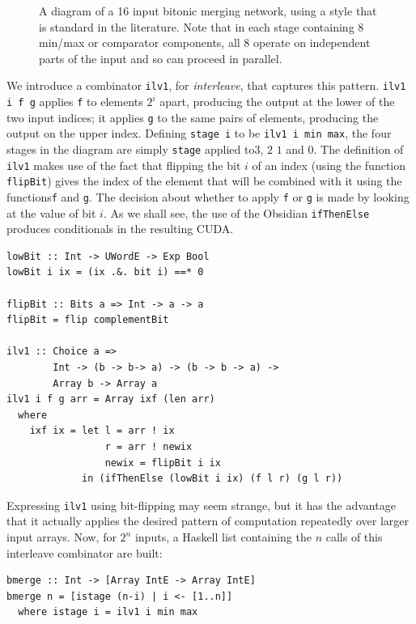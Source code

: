 \documentclass[]{sigplanconf}
\begin{document}
\begin{figure}
\caption{A diagram of a 16 input bitonic merging network, using
a style that is standard in the literature. Note
that in each stage containing 8 min/max or comparator components, all
8 operate on independent parts of the input and so can proceed in parallel.
}
\label{fig:bitonicMerger}
\end{figure}

We introduce a combinator {\tt ilv1}, for {\em interleave}, that captures this pattern.
{\tt ilv1 i f g} applies {\tt f} to elements {\small $2^i$} apart,
producing the output at the lower of the two input indices; it applies {\tt g}
to the same pairs of elements, producing the output on the upper index.
Defining {\tt stage i} to be {\tt ilv1 i min max},
the four stages in the diagram are simply
{\tt stage} applied to{\small  $3$, $2$ $1$} and {\small $0$}.
The definition of {\tt ilv1} makes use of the fact that
flipping the bit $i$ of an index (using
the function {\tt flipBit}) gives the index of the element
that will be combined with it using the functions{\tt f} and {\tt g}.
The decision about whether to apply {\tt f} or {\tt g} is made
by looking at the value of bit $i$.
As we shall see, the use of the Obsidian {\tt ifThenElse}
produces conditionals in the resulting CUDA.
\begin{codesize}
\begin{verbatim}
lowBit :: Int -> UWordE -> Exp Bool
lowBit i ix = (ix .&. bit i) ==* 0

flipBit :: Bits a => Int -> a -> a
flipBit = flip complementBit

ilv1 :: Choice a => 
        Int -> (b -> b-> a) -> (b -> b -> a) -> 
        Array b -> Array a
ilv1 i f g arr = Array ixf (len arr)
  where
    ixf ix = let l = arr ! ix
                 r = arr ! newix
                 newix = flipBit i ix
             in (ifThenElse (lowBit i ix) (f l r) (g l r))
\end{verbatim}
\end{codesize}
\noindent
Expressing {\tt ilv1} using bit-flipping may seem strange, but it has
the advantage that it actually applies the desired pattern of
computation repeatedly over larger input arrays.
Now, for {\small $2^n$} inputs, a Haskell list containing the $n$ calls
of this interleave combinator are built:
\begin{codesize}
\begin{verbatim}
bmerge :: Int -> [Array IntE -> Array IntE]
bmerge n = [istage (n-i) | i <- [1..n]]
  where istage i = ilv1 i min max
\end{verbatim}
\end{codesize}
\end{document}

